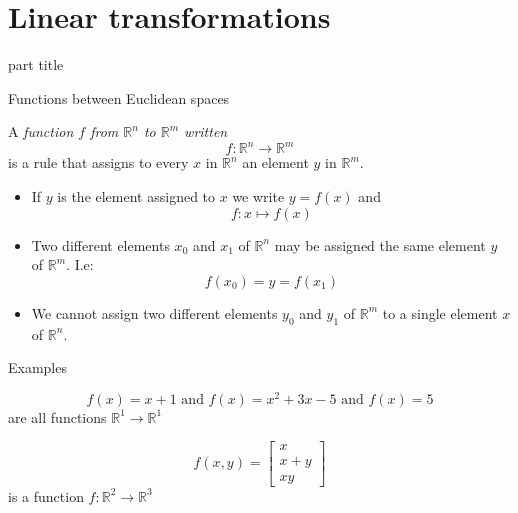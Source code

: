 \documentclass{beamer}
\begin{document}
\section{Linear transformations}

\begin{frame}
\begin{beamercolorbox}[sep=12pt,center]{part title}
\insertsection\par
\end{beamercolorbox}
\end{frame}

\begin{frame}{Functions between Euclidean spaces}
\begin{definition}
A \emph{function $f$ from $\mathbb{R}^n$ to $\mathbb{R}^m$ written}
\begin{equation*}
f:\mathbb{R}^n \rightarrow \mathbb{R}^m
\end{equation*}
is a rule that assigns to every $x$ in $\mathbb{R}^n$ an element $y$ in $\mathbb{R}^m$.
\end{definition}
\begin{itemize}
	\item If $y$ is the element assigned to $x$ we write $y = f(x)$ and
	\begin{equation*}
	f:x \mapsto f(x)
	\end{equation*}
	\item Two different elements $x_0$ and $x_1$ of $\mathbb{R}^n$ may be assigned the same element $y$ of $\mathbb{R}^m$. I.e:
	\begin{equation*}
	f(x_0) = y = f(x_1)
	\end{equation*}
	\item We cannot assign two different elements $y_0$ and $y_1$ of $\mathbb{R}^m$ to a single element $x$ of $\mathbb{R}^n$.
\end{itemize}
\end{frame}

\begin{frame}{Examples}
\begin{example}
\begin{equation*}
f(x) = x+1 \text{ and } f(x) = x^2+3x-5 \text{ and } f(x) = 5
\end{equation*}
are all functions $\mathbb{R}^1 \rightarrow \mathbb{R}^1$
\end{example}
\begin{example}
\begin{equation*}
f(x, y) = \left[
\begin{array}{c}
x\\
x+y\\
xy
\end{array}
\right]
\end{equation*}
is a function $f:\mathbb{R}^2 \rightarrow \mathbb{R}^3$
\end{example}
\end{frame}
\end{document}
